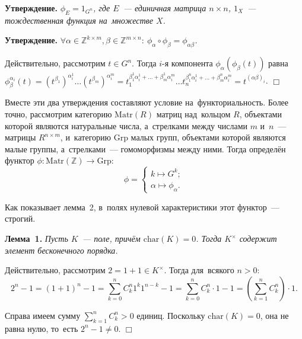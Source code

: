 \documentclass[twoside]{article}
\begin{document}
\medskip\noindent\textbf{Утверждение.}\emph{
    $\phi_{E} = 1_{G^n}$, где $E$~— единичная матрица $n \times n$, $1_X$~— тождественная функция на~множестве $X$.
}

\medskip\noindent\textbf{Утверждение.}\emph{
    $
        \forall \alpha \in \mathbb{Z}^{k \times m}, \beta \in \mathbb{Z}^{m \times n}{:}\ \phi_\alpha \circ \phi_\beta = \phi_{\alpha \beta}
    $.
}\medskip

    Действительно, рассмотрим $t \in G^n$. Тогда $i$-я компонента $\phi_\alpha(\phi_\beta(t))$
    равна $\phi_\beta^{\alpha_i}(t) = (t^{\beta_1})^{\alpha_i^1} \ldots (t^{\beta_m})^{\alpha_i^m}
                                    = t_1^{\beta_1^1 \alpha_i^1 + \ldots + \beta_m^1 \alpha_i^m}
                                      \ldots
                                      t_n^{\beta_1^n \alpha_i^1 + \ldots + \beta_m^n \alpha_i^m}
                                    = t^{(\alpha \beta)_i}$.
\hfill$\Box$\medskip

Вместе эти два утверждения составляют условие на~функториальность. Более точно, рассмотрим категорию
$\mathrm{Matr}(R)$ матриц над~кольцом $R$, объектами которой являются натуральные числа, а~стрелками
между числами $m$ и~$n$~— матрицы $R^{n \times m}$, и~категорию $\mathrm{Grp}$ малых групп,
объектами которой являются малые группы, а~стрелками~— гомоморфизмы между ними.
Тогда определён функтор $\phi : \mathrm{Matr}(\mathbb{Z}) \rightarrow \mathrm{Grp}$:
$$
    \phi = \begin{cases}
        k \mapsto G^k; \\
        \alpha \mapsto \phi_\alpha.
    \end{cases}
$$

Как показывает лемма~2, в~полях нулевой характеристики этот функтор~— строгий.

\medskip\noindent\textbf{Лемма~1.}\emph{
    Пусть $K$~— поле, причём $\mathrm{char}(K) = 0$.
    Тогда $K^\times$ содержит элемент бесконечного порядка.
}\medskip

    Действительно, рассмотрим $2 = 1 + 1 \in K^\times$. Тогда для~всякого $n > 0$:
    $$
        2^n - 1 = (1 + 1)^n - 1 = \sum_{k = 0}^n C^n_k 1^k 1^{n - k} - 1
                                = \sum_{k = 0}^n C^n_k \cdot 1 - 1
                                = \left(\sum_{k = 1}^n C^n_k \right) \cdot 1.
    $$

    Справа имеем сумму $\sum_{k = 1}^n C^n_k > 0$ единиц. Поскольку $\mathrm{char}(K) = 0$,
    она не равна нулю, то~есть $2^n - 1 \neq 0$.
\hfill$\Box$\medskip
\end{document}
